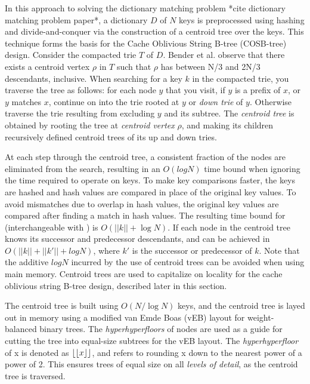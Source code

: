 \documentclass{style}
\begin{document}
In this approach to solving the dictionary matching problem *cite dictionary
matching problem paper*, a dictionary $D$ of $N$ keys is preprocessed using
hashing and divide-and-conquer via the construction of a centroid tree over
the keys. This technique forms the basis for the Cache Oblivious String B-tree
(COSB-tree) design. Consider the compacted trie $T$ of $D$. Bender et al.
observe that there exists a centroid vertex $\rho$ in $T$ such that $\rho$ has
between N/3 and 2N/3 descendants, inclusive. When searching for a key $k$ in
the compacted trie, you traverse the tree as follows: for each node $y$ that
you visit, if $y$ is a prefix of $x$, or $y$ matches $x$, continue on into the
trie rooted at $y$ or \emph{down trie} of $y$. Otherwise traverse the trie
resulting from excluding $y$ and its subtree. The \emph{centroid tree} is
obtained by rooting the tree at \emph{centroid vertex} $\rho$, and making its
children recursively defined centroid trees of its up and down tries.

At each step through the centroid tree, a consistent fraction of the nodes are
eliminated from the search, resulting in an $O(logN)$ time bound when ignoring
the time required to operate on keys. To make key comparisons faster, the keys
are hashed and hash values are compared in place of the original key values.
To avoid mismatches due to overlap in hash values, the original key values are
compared after finding a match in hash values. The resulting time bound for
\Search{} (interchangeable with \Member{}) is $O(||k||+\log{}N)$. If each node
in the centroid tree knows its successor and predecessor descendants, \Pred{}
and \Succ{} can be achieved in $O(||k||+||k'||+logN)$, where $k'$ is the
successor or predecessor of $k$. Note that the additive $logN$ incurred by the
use of centroid trees can be avoided when using main memory. Centroid trees
are used to capitalize on locality for the cache oblivious string B-tree
design, described later in this section.

The centroid tree is built using $O(N/\log{}N)$ keys, and the centroid tree is
layed out in memory using a modified van Emde Boas (vEB) layout for
weight-balanced binary trees. The \emph{hyperhyperfloors} of nodes are used as
a guide for cutting the tree into equal-size subtrees for the vEB layout. The
\emph{hyperhyperfloor} of x is denoted as $\lfloor\lfloor{}x\rfloor\rfloor{}$, and
refers to rounding x down to the nearest power of a power of 2. This ensures
trees of equal size on all \emph{levels of detail}, as the centroid tree is
traversed.
\end{document}
